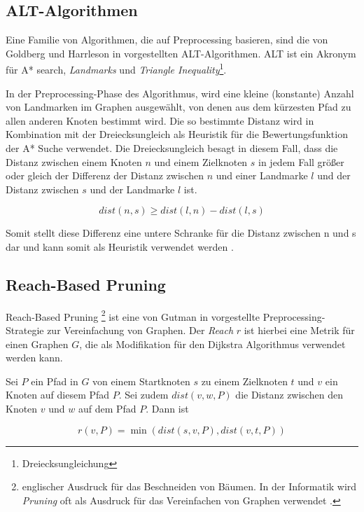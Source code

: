 \subsection{ALT-Algorithmen}
Eine Familie von Algorithmen, die auf Preprocessing basieren, sind die von Goldberg und Harrleson in \cite{Goldberg2005} vorgestellten ALT-Algorithmen. ALT ist ein Akronym für A* search, \textit{Landmarks} und \textit{Triangle Inequality}\footnote{Dreiecksungleichung}. 

In der Preprocessing-Phase des Algorithmus, wird eine kleine (konstante) Anzahl von Landmarken im Graphen ausgewählt, von denen aus dem kürzesten Pfad zu allen anderen Knoten bestimmt wird. Die so bestimmte Distanz wird in Kombination mit der Dreiecksungleich als Heuristik für die Bewertungsfunktion der A* Suche verwendet. 
\newpage
Die Dreiecksungleich besagt in diesem Fall, dass die Distanz zwischen einem Knoten $n$ und einem Zielknoten $s$ in jedem Fall größer oder gleich der Differenz  der Distanz zwischen $n$ und einer Landmarke $l$ und der Distanz zwischen $s$ und der Landmarke $l$ ist.

\begin{equation} \label{eq:3.2}
	dist(n,s) \ge dist(l,n)-dist(l,s)
\end{equation}


Somit stellt diese Differenz eine untere Schranke für die Distanz zwischen n und s dar und kann somit als Heuristik verwendet werden \cite{Goldberg2005}.

\subsection{Reach-Based Pruning}
Reach-Based Pruning \footnote{englischer Ausdruck für das Beschneiden von Bäumen. In der Informatik wird \textit{Pruning} oft als Ausdruck für das Vereinfachen von Graphen verwendet \cite{Wikipedia:00}.} ist eine von Gutman in \cite{Gutman2004} vorgestellte Preprocessing-Strategie zur Vereinfachung von Graphen. Der \textit{Reach} $r$ ist hierbei eine Metrik für einen Graphen $G$, die als Modifikation für den Dijkstra Algorithmus verwendet werden kann. 

Sei $P$ ein Pfad in $G$ von einem Startknoten $s$ zu einem Zielknoten $t$ und $v$ ein Knoten auf diesem Pfad $P$. Sei zudem $dist(v,w,P)$ die Distanz zwischen den Knoten $v$ und $w$ auf dem Pfad $P$. Dann ist

\begin{equation} \label{eq:3.3}
	r(v,P) = \min{(dist(s,v,P), dist(v,t,P))}
\end{equation}

